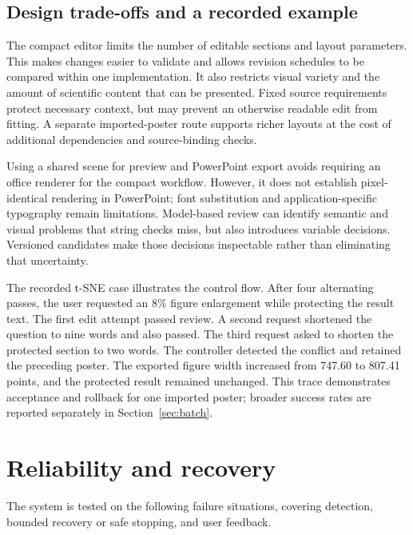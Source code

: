 \documentclass{article}
\begin{document}
\subsection{Design trade-offs and a recorded example}
The compact editor limits the number of editable sections and layout parameters. This makes changes easier to validate and allows revision schedules to be compared within one implementation. It also restricts visual variety and the amount of scientific content that can be presented. Fixed source requirements protect necessary context, but may prevent an otherwise readable edit from fitting. A separate imported-poster route supports richer layouts at the cost of additional dependencies and source-binding checks.

Using a shared scene for preview and PowerPoint export avoids requiring an office renderer for the compact workflow. However, it does not establish pixel-identical rendering in PowerPoint; font substitution and application-specific typography remain limitations. Model-based review can identify semantic and visual problems that string checks miss, but also introduces variable decisions. Versioned candidates make those decisions inspectable rather than eliminating that uncertainty.

The recorded t-SNE case illustrates the control flow. After four alternating passes, the user requested an 8\% figure enlargement while protecting the result text. The first edit attempt passed review. A second request shortened the question to nine words and also passed. The third request asked to shorten the protected section to two words. The controller detected the conflict and retained the preceding poster. The exported figure width increased from 747.60 to 807.41 points, and the protected result remained unchanged. This trace demonstrates acceptance and rollback for one imported poster; broader success rates are reported separately in Section~\ref{sec:batch}.

\section{Reliability and recovery}

The system is tested on the following failure situations, covering detection, bounded recovery or safe stopping, and user feedback.
\end{document}
